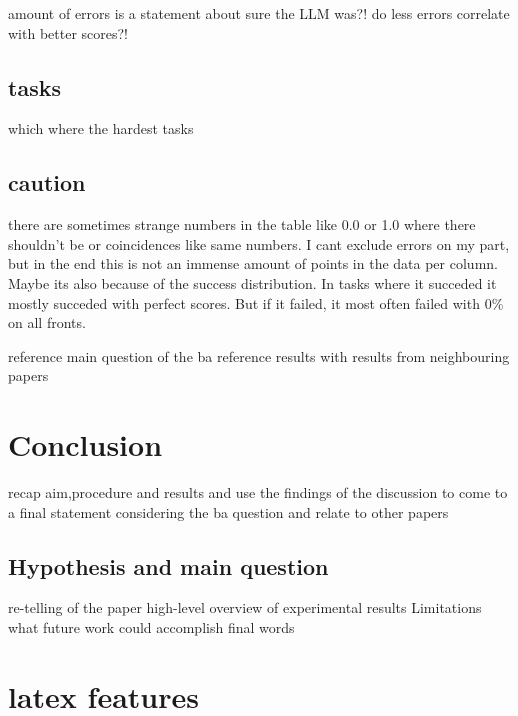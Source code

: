 \documentclass[a4paper,11pt,oneside]{memoir}
\begin{document}
amount of errors is a statement about sure the LLM was?!
    do less errors correlate with better scores?!

\section{tasks}

which where the hardest tasks


\section{caution}
there are sometimes strange numbers in the table like 0.0 or 1.0 where there shouldn't be or coincidences like same numbers. I cant exclude errors on my part, but in the end this is not an immense amount of points in the data per column. Maybe its also because of the success distribution. In tasks where it succeded it mostly succeded with perfect scores. But if it failed, it most often failed with 0\% on all fronts.





reference main question of the ba
reference results with results from neighbouring papers

\chapter{Conclusion}
recap aim,procedure and results and use the findings of the discussion to come to a final statement considering the ba question and relate to other papers
\section{Hypothesis and main question}
\label{Conclusion}
re-telling of the paper
high-level overview of experimental results
Limitations
what future work could accomplish
final words
		
\newpage
			
\chapter{latex features}
\noindent{}\\\\\\
\end{document}
